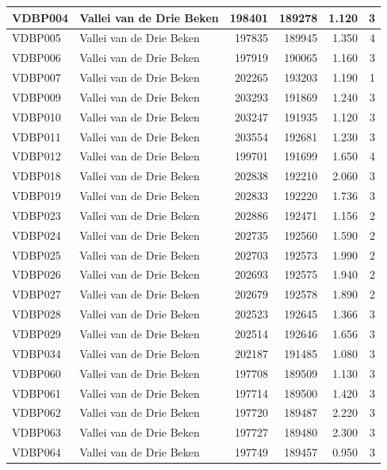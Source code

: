 \documentclass[11pt,]{book}
\begin{document}
\begin{table}
\begin{tabular}[t]{l|l|r|r|r|r}
VDBP004 & Vallei van de Drie Beken & 198401 & 189278 & 1.120 & 3\\
\hline
VDBP005 & Vallei van de Drie Beken & 197835 & 189945 & 1.350 & 4\\
\hline
VDBP006 & Vallei van de Drie Beken & 197919 & 190065 & 1.160 & 3\\
\hline
VDBP007 & Vallei van de Drie Beken & 202265 & 193203 & 1.190 & 1\\
\hline
VDBP009 & Vallei van de Drie Beken & 203293 & 191869 & 1.240 & 3\\
\hline
VDBP010 & Vallei van de Drie Beken & 203247 & 191935 & 1.120 & 3\\
\hline
VDBP011 & Vallei van de Drie Beken & 203554 & 192681 & 1.230 & 3\\
\hline
VDBP012 & Vallei van de Drie Beken & 199701 & 191699 & 1.650 & 4\\
\hline
VDBP018 & Vallei van de Drie Beken & 202838 & 192210 & 2.060 & 3\\
\hline
VDBP019 & Vallei van de Drie Beken & 202833 & 192220 & 1.736 & 3\\
\hline
VDBP023 & Vallei van de Drie Beken & 202886 & 192471 & 1.156 & 2\\
\hline
VDBP024 & Vallei van de Drie Beken & 202735 & 192560 & 1.590 & 2\\
\hline
VDBP025 & Vallei van de Drie Beken & 202703 & 192573 & 1.990 & 2\\
\hline
VDBP026 & Vallei van de Drie Beken & 202693 & 192575 & 1.940 & 2\\
\hline
VDBP027 & Vallei van de Drie Beken & 202679 & 192578 & 1.890 & 2\\
\hline
VDBP028 & Vallei van de Drie Beken & 202523 & 192645 & 1.366 & 3\\
\hline
VDBP029 & Vallei van de Drie Beken & 202514 & 192646 & 1.656 & 3\\
\hline
VDBP034 & Vallei van de Drie Beken & 202187 & 191485 & 1.080 & 3\\
\hline
VDBP060 & Vallei van de Drie Beken & 197708 & 189509 & 1.130 & 3\\
\hline
VDBP061 & Vallei van de Drie Beken & 197714 & 189500 & 1.420 & 3\\
\hline
VDBP062 & Vallei van de Drie Beken & 197720 & 189487 & 2.220 & 3\\
\hline
VDBP063 & Vallei van de Drie Beken & 197727 & 189480 & 2.300 & 3\\
\hline
VDBP064 & Vallei van de Drie Beken & 197749 & 189457 & 0.950 & 3\\

\end{tabular}
\end{table}
\end{document}
